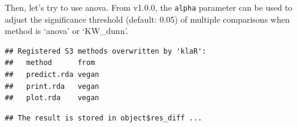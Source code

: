 \documentclass[
]{book}
\newenvironment{Shaded}{\begin{snugshade}}{\end{snugshade}}
\newcommand{\AttributeTok}[1]{\textcolor[rgb]{0.77,0.63,0.00}{#1}}
\newcommand{\CommentTok}[1]{\textcolor[rgb]{0.56,0.35,0.01}{\textit{#1}}}
\newcommand{\ConstantTok}[1]{\textcolor[rgb]{0.00,0.00,0.00}{#1}}
\newcommand{\FunctionTok}[1]{\textcolor[rgb]{0.00,0.00,0.00}{#1}}
\newcommand{\NormalTok}[1]{#1}
\newcommand{\SpecialCharTok}[1]{\textcolor[rgb]{0.00,0.00,0.00}{#1}}
\newcommand{\StringTok}[1]{\textcolor[rgb]{0.31,0.60,0.02}{#1}}
\begin{document}
\begin{Shaded}
\end{Shaded}

Then, let's try to use anova.
From v1.0.0, the \texttt{alpha} parameter can be used to adjust the significance threshold (default: 0.05) of multiple comparisons when method is `anova' or `KW\_dunn'.

\begin{Shaded}
\end{Shaded}

\begin{verbatim}
## Registered S3 methods overwritten by 'klaR':
##   method      from 
##   predict.rda vegan
##   print.rda   vegan
##   plot.rda    vegan
\end{verbatim}

\begin{verbatim}
## The result is stored in object$res_diff ...
\end{verbatim}
\end{document}
